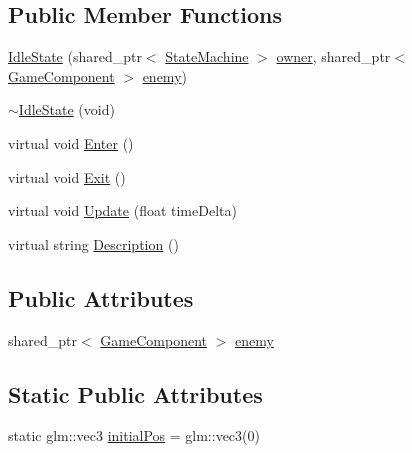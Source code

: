 \subsection*{Public Member Functions}
\begin{DoxyCompactItemize}
\item 
\hyperlink{class_b_g_e_1_1_idle_state_a4ebcc993f1cc6d6b3f4797ffd9c81515}{Idle\-State} (shared\-\_\-ptr$<$ \hyperlink{class_b_g_e_1_1_state_machine}{State\-Machine} $>$ \hyperlink{class_b_g_e_1_1_state_aa1a572a6e24067716eab1f110381bee8}{owner}, shared\-\_\-ptr$<$ \hyperlink{class_b_g_e_1_1_game_component}{Game\-Component} $>$ \hyperlink{class_b_g_e_1_1_idle_state_a4772e9d35d8936ab5a03fa7f39d91da1}{enemy})
\item 
\hyperlink{class_b_g_e_1_1_idle_state_aa5175fe8e0b51b0773372fc3d474d059}{$\sim$\-Idle\-State} (void)
\item 
virtual void \hyperlink{class_b_g_e_1_1_idle_state_a06cd96045d1567017833f954dc2fd775}{Enter} ()
\item 
virtual void \hyperlink{class_b_g_e_1_1_idle_state_aa2fee24b3a1d4ea875d9025af7c6b912}{Exit} ()
\item 
virtual void \hyperlink{class_b_g_e_1_1_idle_state_addc181465d396f8ab69ec40a465cc1ea}{Update} (float time\-Delta)
\item 
virtual string \hyperlink{class_b_g_e_1_1_idle_state_af7ae1f91789b380815b8a6be06bef9f2}{Description} ()
\end{DoxyCompactItemize}
\subsection*{Public Attributes}
\begin{DoxyCompactItemize}
\item 
shared\-\_\-ptr$<$ \hyperlink{class_b_g_e_1_1_game_component}{Game\-Component} $>$ \hyperlink{class_b_g_e_1_1_idle_state_a4772e9d35d8936ab5a03fa7f39d91da1}{enemy}
\end{DoxyCompactItemize}
\subsection*{Static Public Attributes}
\begin{DoxyCompactItemize}
\item 
static glm\-::vec3 \hyperlink{class_b_g_e_1_1_idle_state_a9a00eb22e7ef12f870d34d672fb85961}{initial\-Pos} = glm\-::vec3(0)
\end{DoxyCompactItemize}


